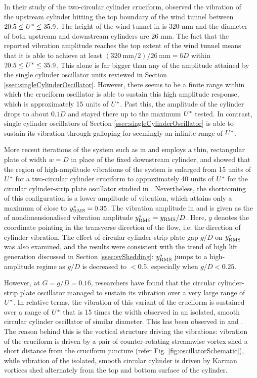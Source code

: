 \documentclass[oneside]{utmthesis}
\begin{document}
In their study of the two-circular cylinder cruciform, \citet{Shirakashi2001} observed the vibration of the upstream cylinder hitting the top boundary of the wind tunnel between $20.5 \leq U^{*} \leq 35.9$. The height of the wind tunnel in \citet{Shirakashi2001} is 320 mm and the diameter of both upstream and downstream cylinders are 26 mm. The fact that the reported vibration amplitude reaches the top extent of the wind tunnel means that it is able to achieve at least $(\SI{320}{\milli\metre}/2)/\SI{26}{\milli\metre} = 6D$ within $20.5 \leq U^{*} \leq 35.9$. This alone is far bigger than any of the amplitude attained by the single cylinder oscillator units reviewed in Section \ref{ssec:singleCylinderOscillator}. However, there seems to be a finite range within which the cruciform oscillator is able to sustain this high amplitude response, which is approximately 15 units of $U^{*}$. Past this, the amplitude of the cylinder drops to about $0.1D$ and stayed there up to the maximum $U^{*}$ tested. In contrast, single cylinder oscillators of Section \ref{ssec:singleCylinderOscillator} is able to sustain its vibration through galloping for seemingly an infinite range of $U^{*}$.

More recent iterations of the system such as in \citet{Koide2007} and \citet{Kato2007} employs a thin, rectangular plate of width $w = D$ in place of the fixed downstream cylinder, and showed that the region of high-amplitude vibrations of the system is enlarged from 15 units of $U^{*}$ for a two-circular cylinder cruciform to approximately 40 units of $U^{*}$ for the circular cylinder-strip plate oscillator studied in \citet{Koide2007}. Nevertheless, the shortcoming of this configuration is a lower amplitude of vibration, which attains only a maximum of close to $y^{*}_{\text{RMS}} = 0.35$. The vibration amplitude in \citet{Koide2007} and \citet{Kato2007} is given as the \rms{} of nondimensionalised vibration amplitude $y^{*}_{\text{RMS}} = y_{\text{RMS}}/D$. Here, $y$ denotes the coordinate pointing in the transverse direction of the flow, i.e. the direction of cylinder vibration. The effect of circular cylinder-strip plate gap $g/D$ on $y^{*}_{\text{RMS}}$ was also examined, and the results were consistent with the trend of high lift generation discussed in Section \ref{ssec:svShedding}: $y^{*}_{\text{RMS}}$ jumps to a high-amplitude regime as $g/D$ is decreased to $< 0.5$, especially when $g/D < 0.25$.

However, at $G = g/D = 0.16$, researchers have found that the circular cylinder-strip plate oscillator managed to sustain its vibration over a very large range of $U^{*}$. In relative terms, the vibration of this variant of the cruciform is sustained over a range of $U^{*}$ that is 15 times the width observed in an isolated, smooth circular cylinder oscillator of similar diameter. This has been observed in \citet{Koide2009} and \citet{Koide2013}. The reason behind this is the vortical structure driving the vibrations: vibration of the cruciform is driven by a pair of counter-rotating streamwise vortex shed a short distance from the cruciform juncture (refer Fig. \ref{fig:oscillatorSchematic}), while vibration of the isolated, smooth circular cylinder is driven by Karman vortices shed alternately from the top and bottom surface of the cylinder.
\end{document}
